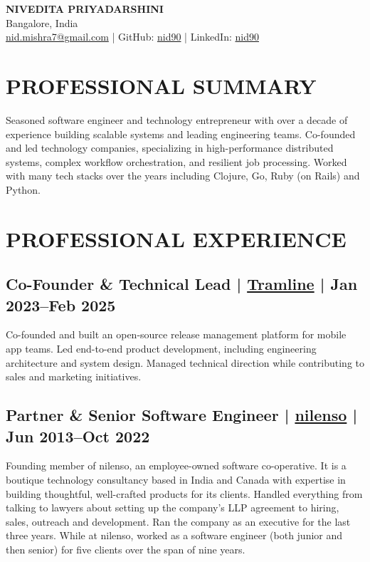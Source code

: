 \documentclass[11pt,a4paper]{article}
\newcommand{\company}[2]{%
  \href{#2}{\mbox{#1}}%
}
\begin{document}
\begin{center}
    {\Huge \textbf{NIVEDITA PRIYADARSHINI}}\\[0.3cm]
    Bangalore, India\\
    \href{mailto:nid.mishra7@gmail.com}{nid.mishra7@gmail.com} |
    GitHub: \href{https://github.com/nid90}{nid90} |
    LinkedIn: \href{https://linkedin.com/in/nid90}{nid90}
\end{center}

\section*{PROFESSIONAL SUMMARY}
Seasoned software engineer and technology entrepreneur with over a decade of experience building scalable systems and leading engineering teams. Co-founded and led technology companies, specializing in high-performance distributed systems, complex workflow orchestration, and resilient job processing. Worked with many tech stacks over the years including Clojure, Go, Ruby (on Rails) and Python.

\section*{PROFESSIONAL EXPERIENCE}

\subsection*{Co-Founder \& Technical Lead | \company{Tramline}{https://tramline.app} | Jan 2023--Feb 2025}
Co-founded and built an open-source release management platform for mobile app teams. Led end-to-end product development, including engineering architecture and system design. Managed technical direction while contributing to sales and marketing initiatives.

\subsection*{Partner \& Senior Software Engineer | \company{nilenso}{https://nilenso.com} | Jun 2013--Oct 2022}
Founding member of nilenso, an employee-owned software co-operative. It is a boutique technology consultancy based in India and Canada with expertise in building thoughtful, well-crafted products for its clients. Handled everything from talking to lawyers about setting up the company's LLP agreement to hiring, sales, outreach and development. Ran the company as an executive for the last three years. While at nilenso, worked as a software engineer (both junior and then senior) for five clients over the span of nine years.
\end{document}
